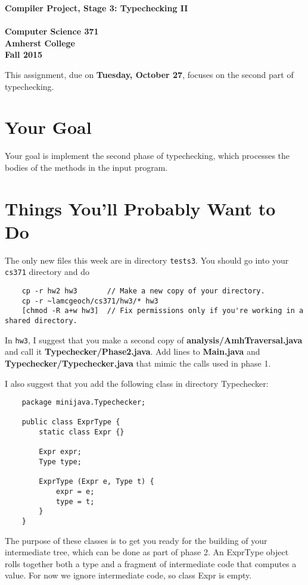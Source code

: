 \documentclass[11pt]{article}
\begin{document}
\begin{center}
\Large \bf Compiler Project, Stage 3: Typechecking  II\\ \mbox{} \\
\large Computer Science 371 \\
\large Amherst College \\
\large Fall 2015
\end{center}

This assignment, due on {\bf Tuesday, October 27}, focuses on the second part of typechecking.

\section{Your Goal}

Your goal is implement the second phase of typechecking, which processes the bodies of the methods in the input program.

\section{Things You'll Probably Want to Do}

The only new files this week are in directory \verb'tests3'.  You should go into your {\tt cs371} directory and do
\begin{verbatim}
    cp -r hw2 hw3       // Make a new copy of your directory.
    cp -r ~lamcgeoch/cs371/hw3/* hw3
    [chmod -R a+w hw3]  // Fix permissions only if you're working in a shared directory.
\end{verbatim}

In {\tt hw3}, I suggest that you make a second copy of {\bf analysis/AmhTraversal.java} and call it 
{\bf Typechecker/Phase2.java}.  Add lines to {\bf Main.java} and {\bf Typechecker/Typechecker.java} that mimic the calls used in phase 1.

I also suggest that you add the following class in directory Typechecker:
\begin{verbatim}
    package minijava.Typechecker;

    public class ExprType {
        static class Expr {}
        
        Expr expr;
        Type type;
        
        ExprType (Expr e, Type t) {
            expr = e;
            type = t;
        }
    }
\end{verbatim}

The purpose of these classes is to get you ready for the building of your intermediate tree, which can be done as part of phase 2.  An ExprType object rolls together both a type and a fragment of intermediate code that computes a value.  For now we ignore intermediate code, so class Expr is empty.
\end{document}
